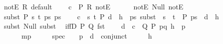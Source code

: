 \begin{isabellebody}
\isanewline
\ \ notE\ {\isacharparenleft}{\kern0pt}R{\isacharparenright}{\kern0pt}{\isacharcolon}{\kern0pt}\ {\isachardoublequoteopen}default{\isachardoublequoteclose}\isanewline
\ \ \ \ {\isachardoublequoteopen}\isactrlbold {\isasymlambda}{\isacharparenleft}{\kern0pt}c{\isacharcolon}{\kern0pt}\ {\isacharunderscore}{\kern0pt}{\isacharparenright}{\kern0pt}\ P\ R{\isachardot}{\kern0pt}\ notE\ {\isasymcdot}\ {\isacharunderscore}{\kern0pt}\ {\isasymcdot}\ {\isacharunderscore}{\kern0pt}{\isachardoublequoteclose}\isanewline
\isanewline
\ \ notE{\isacharcolon}{\kern0pt}\ {\isachardoublequoteopen}Null{\isachardoublequoteclose}\ {\isachardoublequoteopen}notE{\isachardoublequoteclose}\isanewline
\isanewline
\ \ subst\ {\isacharparenleft}{\kern0pt}P{\isacharparenright}{\kern0pt}{\isacharcolon}{\kern0pt}\ {\isachardoublequoteopen}{\isasymlambda}s\ t\ ps{\isachardot}{\kern0pt}\ ps{\isachardoublequoteclose}\isanewline
\ \ \ \ {\isachardoublequoteopen}\isactrlbold {\isasymlambda}{\isacharparenleft}{\kern0pt}c{\isacharcolon}{\kern0pt}\ {\isacharunderscore}{\kern0pt}{\isacharparenright}{\kern0pt}\ s\ t\ P\ {\isacharparenleft}{\kern0pt}d{\isacharcolon}{\kern0pt}\ {\isacharunderscore}{\kern0pt}{\isacharparenright}{\kern0pt}\ {\isacharparenleft}{\kern0pt}h{\isacharcolon}{\kern0pt}\ {\isacharunderscore}{\kern0pt}{\isacharparenright}{\kern0pt}\ ps{\isachardot}{\kern0pt}\ subst\ {\isasymcdot}\ s\ {\isasymcdot}\ t\ {\isasymcdot}\ P\ ps\ {\isasymbullet}\ d\ {\isasymbullet}\ h{\isachardoublequoteclose}\isanewline
\isanewline
\ \ subst{\isacharcolon}{\kern0pt}\ {\isachardoublequoteopen}Null{\isachardoublequoteclose}\ {\isachardoublequoteopen}subst{\isachardoublequoteclose}\isanewline
\isanewline
\ \ iffD{}\ {\isacharparenleft}{\kern0pt}P{\isacharcomma}{\kern0pt}\ Q{\isacharparenright}{\kern0pt}{\isacharcolon}{\kern0pt}\ {\isachardoublequoteopen}fst{\isachardoublequoteclose}\isanewline
\ \ \ \ {\isachardoublequoteopen}\isactrlbold {\isasymlambda}{\isacharparenleft}{\kern0pt}d{\isacharcolon}{\kern0pt}\ {\isacharunderscore}{\kern0pt}{\isacharparenright}{\kern0pt}\ {\isacharparenleft}{\kern0pt}c{\isacharcolon}{\kern0pt}\ {\isacharunderscore}{\kern0pt}{\isacharparenright}{\kern0pt}\ Q\ P\ pq\ {\isacharparenleft}{\kern0pt}h{\isacharcolon}{\kern0pt}\ {\isacharunderscore}{\kern0pt}{\isacharparenright}{\kern0pt}\ p{\isachardot}{\kern0pt}\isanewline
\ \ \ \ \ \ \ mp\ {\isasymcdot}\ {\isacharunderscore}{\kern0pt}\ {\isasymcdot}\ {\isacharunderscore}{\kern0pt}\ {\isasymbullet}\ {\isacharparenleft}{\kern0pt}spec\ {\isasymcdot}\ {\isacharunderscore}{\kern0pt}\ {\isasymcdot}\ p\ {\isasymbullet}\ d\ {\isasymbullet}\ {\isacharparenleft}{\kern0pt}conjunct{}\ {\isasymcdot}\ {\isacharunderscore}{\kern0pt}\ {\isasymcdot}\ {\isacharunderscore}{\kern0pt}\ {\isasymbullet}\ h{\isacharparenright}{\kern0pt}{\isacharparenright}{\kern0pt}{\isachardoublequoteclose}\isanewline

\end{isabellebody}
